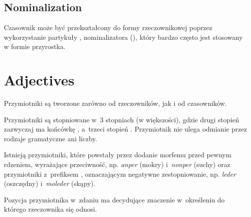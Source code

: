 \subsection{Nominalization}

Czasownik może być przekształcony do formy rzeczownikowej poprzez wykorzystanie
partykuły , nominalizatora (\Nmlz{}), który bardzo często jest stosowany w
formie przyrostka.




\section{Adjectives}

Przymiotniki są tworzone zarówno od rzeczowników, jak i od czasowników.

Przymiotniki są stopniowane w~3 stopniach (w większości), gdzie drugi stopień
zazwyczaj ma końcówkę , a~trzeci stopień . Przymiotnik nie
ulega odmianie przez rodzaje gramatyczne ani liczby.

Istnieją przymiotniki, które powstały przez dodanie morfemu  przed
pewnym rdzeniem, wyrażające przeciwność, np. \emph{anper}  (mokry)
i~\emph{nonper}  (suchy) oraz przymiotniki z~prefiksem ,
oznaczającym negatywne zestopniowanie, np. \emph{leder}  (oszczędny)
i~\emph{moleder}  (skąpy).

Pozycja przymiotnika w~zdaniu ma decydujące znaczenie w~określeniu do którego
rzeczownika się odnosi.





